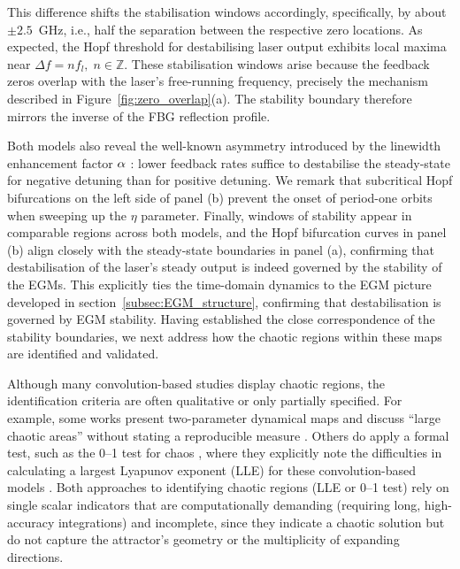 This difference shifts the stabilisation windows accordingly, specifically, by about $\pm 2.5$~GHz, i.e., half the separation between the respective zero locations.
As expected, the Hopf threshold for destabilising laser output exhibits local maxima near $\Delta f = n f_l,\; n\in\mathbb{Z}$.
These stabilisation windows arise because the feedback zeros overlap with the laser's free-running frequency, precisely the mechanism described in Figure~\ref{fig:zero_overlap}(a).
The stability boundary therefore mirrors the inverse of the FBG reflection profile.
%
\par
%
Both models also reveal the well-known asymmetry introduced by the linewidth enhancement factor $\alpha$ \cite{erneux2010laser}: lower feedback rates suffice to destabilise the steady-state for negative detuning than for positive detuning.
We remark that subcritical Hopf bifurcations on the left side of panel (b) prevent the onset of period-one orbits when sweeping up the $\eta$ parameter.
Finally, windows of stability appear in comparable regions across both models, and the Hopf bifurcation curves in panel (b) align closely with the steady-state boundaries in panel (a), confirming that destabilisation of the laser’s steady output is indeed governed by the stability of the EGMs.
This explicitly ties the time-domain dynamics to the EGM picture developed in section~\ref{subsec:EGM_structure}, confirming that destabilisation is governed by EGM stability.
Having established the close correspondence of the stability boundaries, we next address how the chaotic regions within these maps are identified and validated.
%
\par
%
Although many convolution-based studies display chaotic regions, the identification criteria are often qualitative or only partially specified.
For example, some works present two-parameter dynamical maps and discuss “large chaotic areas” without stating a reproducible measure \cite{li2015chaotic,li2020stable,li2012distributed}.
Others do apply a formal test, such as the 0–1 test for chaos \cite{gottwald2009implementation}, where they explicitly note the difficulties in calculating a largest Lyapunov exponent (LLE) for these convolution-based models \cite{jiang2021characterizing}.
Both approaches to identifying chaotic regions (LLE or 0–1 test) rely on single scalar indicators that are computationally demanding (requiring long, high-accuracy integrations) and incomplete, since they indicate a chaotic solution but do not capture the attractor’s geometry or the multiplicity of expanding directions.
%
\par
